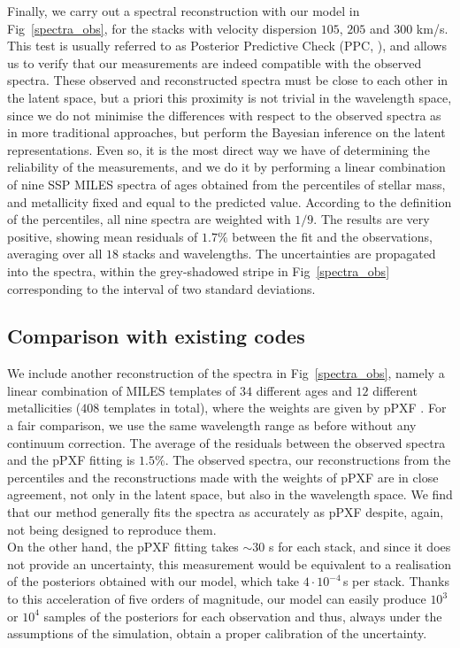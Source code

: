 Finally, we carry out a spectral reconstruction with our model in Fig~\ref{spectra_obs}, for the stacks with velocity dispersion $105$, $205$ and $300$ km/s. This test is usually referred to as Posterior Predictive Check (PPC,  \citealp{talts2020validating}), and allows us to verify that our measurements are indeed compatible with the observed spectra. These observed and reconstructed spectra must be close to each other in the latent space, but a priori this proximity is not trivial in the wavelength space, since we do not minimise the differences with respect to the observed spectra as in more traditional approaches, but perform the Bayesian inference on the latent representations. Even so, it is the most direct way we have of determining the  reliability of the measurements, and we do it by performing a linear combination of nine SSP MILES spectra of ages obtained from the percentiles of stellar mass, and metallicity fixed and equal to the predicted value. According to the definition of the percentiles, all nine spectra are weighted with $1/9$. The results are very positive, showing mean residuals of  $1.7\%$ between the fit and the observations, averaging over all $18$  stacks and wavelengths. The uncertainties are propagated into the spectra, within the grey-shadowed stripe in Fig~\ref{spectra_obs} corresponding to the interval of two standard deviations.

\subsection{Comparison with existing codes}
\label{compare_ppxf}

We include another reconstruction of the spectra in Fig~\ref{spectra_obs}, namely a linear combination of MILES templates of  $34$ different ages and $12$ different metallicities ($408$ templates in total), where the weights are given by pPXF \citep{ppxf}. For a fair comparison, we use the same wavelength range as before without any continuum correction. The average of the residuals between the observed spectra and the pPXF fitting is $1.5 \%$. The observed spectra, our reconstructions from the percentiles and the reconstructions made with the weights of pPXF are in close agreement, not only in the latent space, but also in the wavelength space. We find that our method generally fits the spectra as accurately as pPXF despite, again, not being designed to reproduce them.\\

 On the other hand, the pPXF fitting takes $\sim30$ s for each stack, and since it does not provide an uncertainty, this measurement would be equivalent to a realisation of the posteriors obtained with our model, which take $4 \cdot 10^{-4}$\,s per stack.  Thanks to this acceleration of five orders of magnitude, our model can easily produce $10^3$ or $10^4$ samples of the posteriors for each observation and thus, always under the assumptions of the simulation, obtain a proper calibration of the uncertainty.


